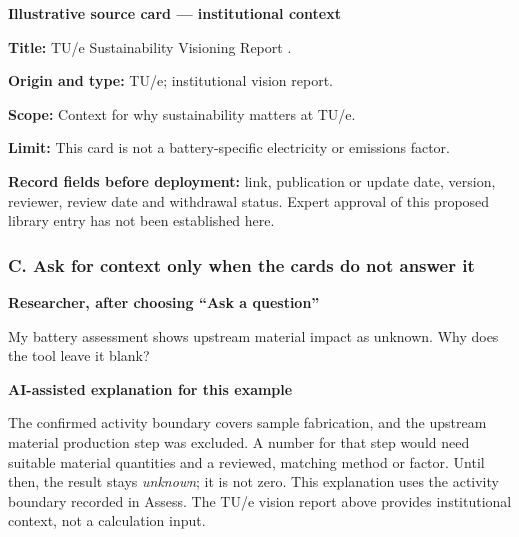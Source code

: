 \documentclass[11pt,a4paper]{article}
\begin{document}
\begin{learnscreen}
\textbf{Illustrative source card --- institutional context}\par
\textbf{Title:} TU/e Sustainability Visioning Report \citep{tue_sustainability_2021}.\par
\textbf{Origin and type:} TU/e; institutional vision report.\par
\textbf{Scope:} Context for why sustainability matters at TU/e.\par
\textbf{Limit:} This card is not a battery-specific electricity or emissions factor.\par
\textbf{Record fields before deployment:} link, publication or update date, version, reviewer, review date and withdrawal status. Expert approval of this proposed library entry has not been established here.\par\medskip
{}\quad
{}\quad
{}
\end{learnscreen}

\subsubsection*{C. Ask for context only when the cards do not answer it}
\begin{flushright}\begin{learnuser}
\textbf{Researcher, after choosing ``Ask a question''}\par
My battery assessment shows upstream material impact as unknown. Why does the tool leave it blank?
\end{learnuser}\end{flushright}

\begin{learnscreen}
\textbf{AI-assisted explanation for this example}\par
The confirmed activity boundary covers sample fabrication, and the upstream material production step was excluded. A number for that step would need suitable material quantities and a reviewed, matching method or factor. Until then, the result stays \emph{unknown}; it is not zero. This explanation uses the activity boundary recorded in Assess. The TU/e vision report above provides institutional context, not a calculation input.\par\medskip
{}\quad
{}\quad
{}
\end{learnscreen}
\end{document}
